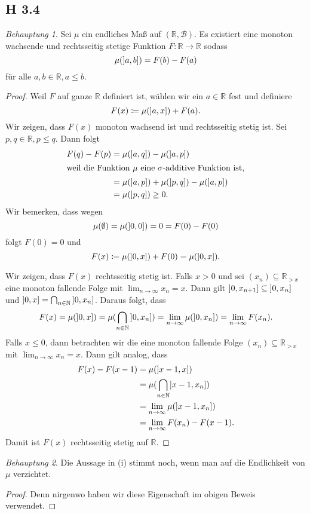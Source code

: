 \documentclass[fleqn,draft,a5paper]{article}
\theoremstyle{remark}
\newtheorem*{Behauptung}{Behauptung}
\begin{document}
\subsection{H 3.4}
\begin{Behauptung}
  Sei \(\mu\) ein endliches Maß auf \((\mathbb{R}, \mathcal{B})\).  Es existiert eine monoton
  wachsende und rechtsseitig stetige Funktion
  \(F\colon \mathbb{R} \to \mathbb{R}\) sodass
  \[\mu(\linterval{a}{b}) = F(b) - F(a)\]
  für alle \(a, b \in \mathbb{R}, a \le b\).
\end{Behauptung}
\begin{proof}
  Weil \(F\) auf ganze \(\mathbb{R}\) definiert ist, wählen wir ein \(a \in \mathbb{R}\) fest
  und definiere
  \[F(x) \coloneq \mu(\linterval{a}{x}) + F(a).\]
  Wir zeigen, dass \(F(x)\) monoton wachsend ist und rechtsseitig stetig
  ist.  Sei \(p, q \in \mathbb{R}, p \le q\).  Dann folgt
  \begin{align*}
    F(q) - F(p) &= \mu(\linterval{a}{q}) - \mu(\linterval{a}{p}) \\
    \intertext{weil die Funktion \(\mu\) eine \(\sigma\)-additive Funktion ist,}
    &= \mu(\linterval{a}{p}) + \mu(\linterval{p}{q}) - \mu(\linterval{a}{p})
    \\
    &= \mu(\linterval{p}{q}) \ge 0.
  \end{align*}
  Wir bemerken, dass wegen
  \[\mu(\emptyset) = \mu(\linterval{0}{0}) = 0 = F(0) - F(0)\] folgt \(F(0) = 0\)
  und
  \[F(x) \coloneq \mu(\linterval{0}{x}) + F(0) = \mu(\linterval{0}{x}).\]


  Wir zeigen, dass \(F(x)\) rechtsseitig stetig ist.  Falls \(x > 0\) und sei
  \((x_{n}) \subseteq \mathbb{R}_{>x}\) eine monoton fallende Folge mit
  \(\lim_{n \to \infty}{x_{n}} = x\).  Dann gilt
  \(\linterval{0}{x_{n+1}} \subseteq \linterval{0}{x_{n}}\) und
  \(\linterval{0}{x} = \bigcap_{n \in \mathbb{N}}{\linterval{0}{x_{n}}}\).  Daraus folgt,
  dass
  \[F(x) = \mu(\linterval{0}{x}) = \mu(\bigcap_{n \in \mathbb{N}}{\linterval{0}{x_{n}}}) =
    \lim_{n \to \infty}\mu(\linterval{0}{x_{n}}) = \lim_{n \to \infty}F(x_{n}).\]
  Falls \(x \le 0\), dann betrachten wir die eine monoton fallende Folge   \((x_{n}) \subseteq \mathbb{R}_{>x}\)  mit
  \(\lim_{n \to \infty}{x_{n}} = x\).  Dann gilt analog, dass
  \begin{align*}
    F(x) - F(x-1) &= \mu(\linterval{x-1}{x}) \\
                  &= \mu(\bigcap_{n\in \mathbb{N}}\linterval{x-1}{x_{n}}) \\
                  &= \lim_{n \to \infty}\mu(\linterval{x-1}{x_{n}}) \\
                  &= \lim_{n \to \infty}F(x_{n}) - F(x-1).  
  \end{align*}
  Damit ist \(F(x)\) rechtsseitig stetig auf \(\mathbb{R}\).
\end{proof}
\begin{Behauptung}
  Die Aussage in (i) stimmt noch, wenn man auf die Endlichkeit von \(\mu\) verzichtet.
\end{Behauptung}
\begin{proof}
  Denn nirgenwo haben wir diese Eigenschaft im obigen Beweis verwendet.
\end{proof}
\end{document}
